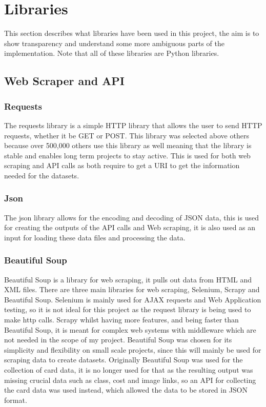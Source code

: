\documentclass{report} %
\begin{document}
\section{Libraries}
This section describes what libraries have been used in this project, the aim is to show transparency and understand some more ambiguous parts of the implementation. Note that all of these libraries are Python libraries.
\subsection{Web Scraper and API}
\subsubsection{Requests}
The requests library is a simple HTTP library that allows the user to send HTTP requests, whether it be GET or POST. This library was selected above others because over 500,000 others use this library as well meaning that the library is stable and enables long term projects to stay active. This is used for both web scraping and API calls as both require to get a URI to get the information needed for the datasets.
\subsubsection{Json}
The json library allows for the encoding and decoding of JSON data, this is used for creating the outputs of the API calls and Web scraping, it is also used as an input for loading these data files and processing the data.
\subsubsection{Beautiful Soup}
Beautiful Soup is a library for web scraping, it pulls out data from HTML and XML files. There are three main libraries for web scraping, Selenium,  Scrapy and Beautiful Soup. Selenium is mainly used for AJAX requests and Web Application testing, so it is not ideal for this project as the request library is being used to make http calls. Scrapy whilst having more features, and being faster than Beautiful Soup, it is meant for complex web systems with middleware which are not needed in the scope of my project. Beautiful Soup was chosen for its simplicity and flexibility on small scale projects, since this will mainly be used for scraping data to create datasets. Originally Beautiful Soup was used for the collection of card data, it is no longer used for that as the resulting output was missing crucial data such as class, cost and image links, so an API for collecting the card data was used instead, which allowed the data to be stored in JSON format.
\end{document}
